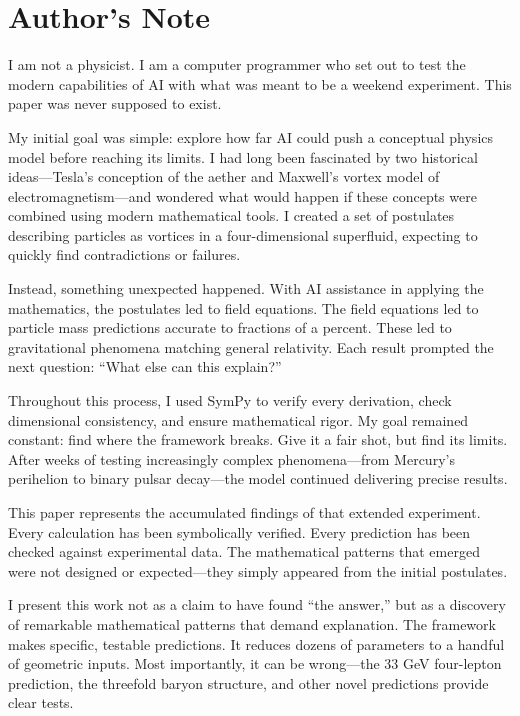 \section*{Author's Note}

I am not a physicist. I am a computer programmer who set out to test the modern capabilities of AI with what was meant to be a weekend experiment. This paper was never supposed to exist.

My initial goal was simple: explore how far AI could push a conceptual physics model before reaching its limits. I had long been fascinated by two historical ideas---Tesla's conception of the aether and Maxwell's vortex model of electromagnetism---and wondered what would happen if these concepts were combined using modern mathematical tools. I created a set of postulates describing particles as vortices in a four-dimensional superfluid, expecting to quickly find contradictions or failures.

Instead, something unexpected happened. With AI assistance in applying the mathematics, the postulates led to field equations. The field equations led to particle mass predictions accurate to fractions of a percent. These led to gravitational phenomena matching general relativity. Each result prompted the next question: ``What else can this explain?''

Throughout this process, I used SymPy to verify every derivation, check dimensional consistency, and ensure mathematical rigor. My goal remained constant: find where the framework breaks. Give it a fair shot, but find its limits. After weeks of testing increasingly complex phenomena---from Mercury's perihelion to binary pulsar decay---the model continued delivering precise results.

This paper represents the accumulated findings of that extended experiment. Every calculation has been symbolically verified. Every prediction has been checked against experimental data. The mathematical patterns that emerged were not designed or expected---they simply appeared from the initial postulates.

I present this work not as a claim to have found ``the answer,'' but as a discovery of remarkable mathematical patterns that demand explanation. The framework makes specific, testable predictions. It reduces dozens of parameters to a handful of geometric inputs. Most importantly, it can be wrong---the 33 GeV four-lepton prediction, the threefold baryon structure, and other novel predictions provide clear tests.

